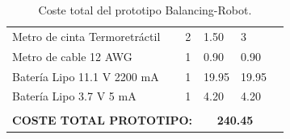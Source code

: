 \begin{table}[H]
\begin{tabular}{|l|l|l|l|l}
		Metro de cinta Termoretráctil                                   & 2                                         & 1.50                                                                                                                & 3                                                                                                                &  \\ \cline{1-4}
		Metro de cable 12 AWG                                           & 1                                         & 0.90                                                                                                                & 0.90                                                                                                             &  \\ \cline{1-4}
		Batería Lipo 11.1 V 2200 mA                                     & 1                                         & 19.95                                                                                                               & 19.95                                                                                                            &  \\ \cline{1-4}
		Batería Lipo 3.7 V 5 mA                                         & 1                                         & 4.20                                                                                                                & 4.20                                                                                                             &  \\ \cline{1-4}
		\multicolumn{2}{|c|}{}                                                                                      & \multicolumn{2}{c|}{\cellcolor[HTML]{FD6864}}                                                                                                                                                                                          &  \\
		\multicolumn{2}{|c|}{\multirow{-2}{*}{\textbf{COSTE TOTAL PROTOTIPO:}}}                                     & \multicolumn{2}{c|}{\multirow{-2}{*}{\cellcolor[HTML]{FD6864}\textbf{240.45}}}                                                                                                                                                         &  \\ \cline{1-4}
	\end{tabular}
	\caption{Coste total del prototipo Balancing-Robot.}
	\label{tabla:coste}
\end{table}


